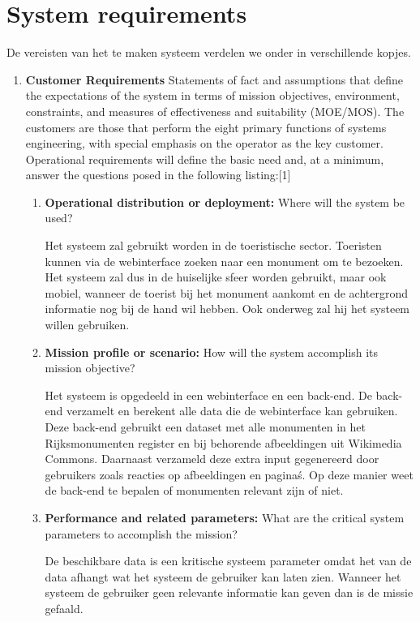 \documentclass{article}
\begin{document}
\section{System requirements}
De vereisten van het te maken systeem verdelen we onder in verschillende kopjes.
\begin{enumerate}
	
	\item{\textbf{Customer Requirements}}
	Statements of fact and assumptions that define the expectations of the system in terms of mission objectives, environment, constraints, and measures of effectiveness and suitability (MOE/MOS). The customers are those that perform the eight primary functions of systems engineering, with special emphasis on the operator as the key customer. Operational requirements will define the basic need and, at a minimum, answer the questions posed in the following listing:[1]
	\begin{enumerate}
		\item{\textbf{Operational distribution or deployment:}} Where will the system be used?
		
		Het systeem zal gebruikt worden in de toeristische sector. Toeristen kunnen via de webinterface zoeken naar een monument om te bezoeken. Het systeem zal dus in de huiselijke sfeer worden gebruikt, maar ook mobiel, wanneer de toerist bij het monument aankomt en de achtergrond informatie nog bij de hand wil hebben. Ook onderweg zal hij het systeem willen gebruiken.
		\item{\textbf{Mission profile or scenario:}} How will the system accomplish its mission objective? 
		
		Het systeem is opgedeeld in een webinterface en een back-end. De back-end verzamelt en berekent alle data die de webinterface kan gebruiken. Deze back-end gebruikt een dataset met alle monumenten in het Rijksmonumenten register en bij behorende afbeeldingen uit Wikimedia Commons. Daarnaast verzameld deze extra input gegenereerd door gebruikers zoals reacties op afbeeldingen en pagina\'s. Op deze manier weet de back-end te bepalen of monumenten relevant zijn of niet. 
		
		\item{\textbf{Performance and related parameters:}} What are the critical system parameters to accomplish the mission?
		
		De beschikbare data is een kritische systeem parameter omdat het van de data afhangt wat het systeem de gebruiker kan laten zien. Wanneer het systeem de gebruiker geen relevante informatie kan geven dan is de missie gefaald.
		

\end{enumerate}
\end{enumerate}
\end{document}
